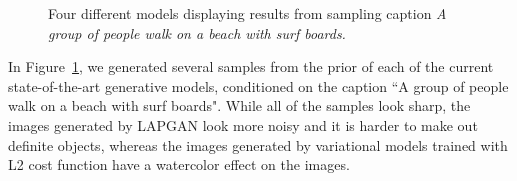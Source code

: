 \documentclass{article} %
\begin{document}
\begin{figure}[!t]
\captionsetup[subfigure]{labelformat=empty}
\begin{center}
\quad
%
\quad
%
\quad
%
\quad
%
\end{center}
\caption{Four different models displaying results from sampling caption \textit{A group of people walk on a beach with surf boards.}}
\label{fig:diffmodels}
\vspace{-0.2cm}
\end{figure}

In Figure~\ref{fig:diffmodels}, we generated several samples from the prior of each of the current state-of-the-art generative models, conditioned on the caption ``A group of people walk on a beach with surf boards". While all of the samples look sharp, the images generated by LAPGAN look more noisy and it is harder to make out definite objects, 
whereas the images generated by variational models trained with L2 cost function have a watercolor effect on the images.
\end{document}
